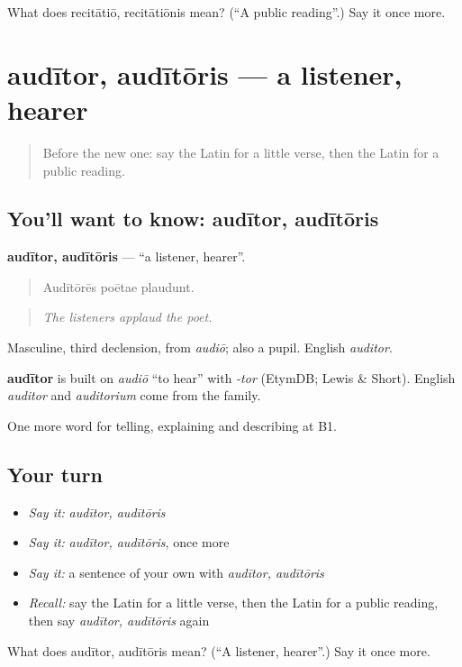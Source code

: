 \begin{tcolorbox}[breakable,colback=teal!4,colframe=teal!35!black,title={Before you move on}]
What does recitātiō, recitātiōnis mean? (\textquotedblleft{}A public reading\textquotedblright{}.) Say it once more.
\end{tcolorbox}
\section[audītor, audītōris]{audītor, audītōris — a listener, hearer}

\label{lesson:LA-C549-auditor}



\begin{quote}
Before the new one: say the Latin for a little verse, then the Latin for a public reading.
\end{quote}

\subsection*{You'll want to know: audītor, audītōris}
\textbf{audītor, audītōris} — \textquotedblleft{}a listener, hearer\textquotedblright{}.

\begin{quote}
Audītōrēs poētae plaudunt.
\end{quote}

\begin{quote}
\emph{The listeners applaud the poet.}
\end{quote}

Masculine, third declension, from \emph{audiō}; also a pupil. English \emph{auditor}.

\begin{cousinweb}
\textbf{audītor} is built on \emph{audiō} \textquotedblleft{}to hear\textquotedblright{} with \emph{-tor} (EtymDB; Lewis \& Short). English \emph{auditor} and \emph{auditorium} come from the family.
\end{cousinweb}

\begin{grammarlens}[title={What you've built}]
One more word for telling, explaining and describing at B1.
\end{grammarlens}

\subsection*{Your turn}
\begin{itemize}
\raggedright
  \item \emph{Say it:} \emph{audītor, audītōris}
  \item \emph{Say it:} \emph{audītor, audītōris}, once more
  \item \emph{Say it:} a sentence of your own with \emph{audītor, audītōris}
  \item \emph{Recall:} say the Latin for a little verse, then the Latin for a public reading, then say \emph{audītor, audītōris} again
\end{itemize}

\begin{tcolorbox}[breakable,colback=teal!4,colframe=teal!35!black,title={Before you move on}]
What does audītor, audītōris mean? (\textquotedblleft{}A listener, hearer\textquotedblright{}.) Say it once more.
\end{tcolorbox}
